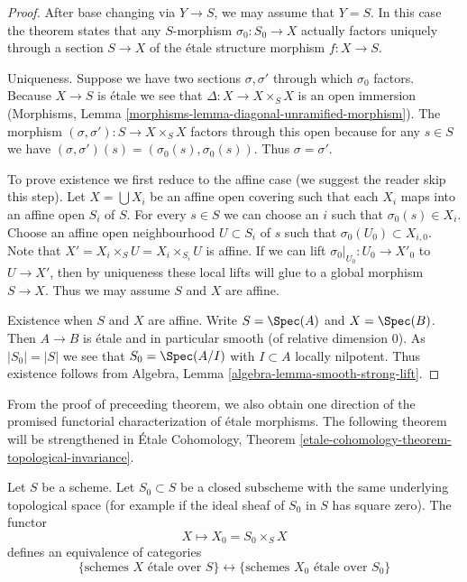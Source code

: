 \begin{proof}
After base changing via $Y \to S$, we may assume that $Y = S$.
In this case the theorem states that any $S$-morphism $\sigma_0 : S_0 \to X$
actually factors uniquely through a section $S \to X$ of the
\'etale structure morphism $f : X \to S$.

\medskip\noindent
Uniqueness. Suppose we have two sections $\sigma, \sigma'$
through which $\sigma_0$ factors. Because $X \to S$ is \'etale
we see that $\Delta : X \to X \times_S X$ is an open immersion
(Morphisms, Lemma \ref{morphisms-lemma-diagonal-unramified-morphism}).
The morphism $(\sigma, \sigma') : S \to X \times_S X$ factors
through this open because for any $s \in S$ we have
$(\sigma, \sigma')(s) = (\sigma_0(s), \sigma_0(s))$. Thus
$\sigma = \sigma'$.

\medskip\noindent
To prove existence we first reduce to the affine case
(we suggest the reader skip this step).
Let $X = \bigcup X_i$ be an affine open covering such
that each $X_i$ maps into an affine open $S_i$ of $S$.
For every $s \in S$ we can choose an $i$ such that
$\sigma_0(s) \in X_i$.
Choose an affine open neighbourhood $U \subset S_i$ of $s$
such that $\sigma_0(U_0) \subset X_{i, 0}$. Note that
$X' = X_i \times_S U = X_i \times_{S_i} U$ is affine.
If we can lift $\sigma_0|_{U_0} : U_0 \to X'_0$ to
$U \to X'$, then by uniqueness these local lifts will glue
to a global morphism $S \to X$. Thus we may assume $S$ and
$X$ are affine.

\medskip\noindent
Existence when $S$ and $X$ are affine. Write $S = \Spec(A)$
and $X = \Spec(B)$. Then $A \to B$ is \'etale and in particular
smooth (of relative dimension $0$). As $|S_0| = |S|$ we see
that $S_0 = \Spec(A/I)$ with $I \subset A$ locally nilpotent.
Thus existence follows from
Algebra, Lemma \ref{algebra-lemma-smooth-strong-lift}.
\end{proof}

\noindent
From the proof of preceeding theorem, we also obtain one direction of the
promised functorial characterization of \'etale morphisms. The following
theorem will be strengthened in
\'Etale Cohomology,
Theorem \ref{etale-cohomology-theorem-topological-invariance}.

\begin{theorem}
\label{theorem-remarkable-equivalence}
Let $S$ be a scheme.
Let $S_0 \subset S$ be a closed subscheme with the same underlying
topological space (for example if the ideal sheaf of $S_0$ in $S$
has square zero). The functor
$$
X \longmapsto X_0 = S_0 \times_S X
$$
defines an equivalence of categories
$$
\{
\text{schemes }X\text{ \'etale over }S
\}
\leftrightarrow
\{
\text{schemes }X_0\text{ \'etale over }S_0
\}
$$
\end{theorem}

